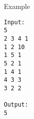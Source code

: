 Example
\begin{verbatim}
Input:
5
2 3 4 1
1 2 10
1 5 1
5 2 1
1 4 1
4 3 3
3 2 2

Output:
5
\end{verbatim}